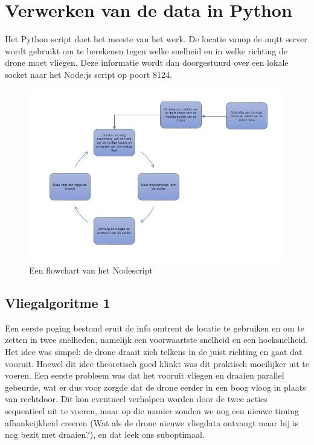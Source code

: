 \section{Verwerken van de data in Python}


Het Python script doet het meeste van het werk. De locatie vanop de mqtt server wordt gebruikt om te berekenen tegen welke snelheid en in welke richting de drone moet vliegen. Deze informatie wordt dan doorgestuurd over een lokale socket naar het Node.js script op poort 8124.

\begin{figure}[h]
\caption{Een flowchart van het Nodescript}
\centering
\includegraphics[width=\textwidth]{images/python_client_flowchart}
\end{figure}

\subsection{Vliegalgoritme 1}

Een eerste poging bestond eruit de info omtrent de locatie te gebruiken en om te zetten in twee snelheden, namelijk een voorwaartste snelheid en een hoeksnelheid. Het idee was simpel: de drone draait zich telkens in de juist richting en gaat dat vooruit. Hoewel dit idee theoretisch goed klinkt was dit praktisch moeilijker uit te voeren. Een eerste probleem was dat het vooruit vliegen en draaien parallel gebeurde, wat er dus voor zorgde dat de drone eerder in een boog vloog in plaats van rechtdoor. Dit kon eventueel verholpen worden door de twee acties sequentieel uit te voeren, maar op die manier zouden we nog een nieuwe timing afhankeijkheid creeren (Wat als de drone nieuwe vliegdata ontvangt maar hij is nog bezit met draaien?), en dat leek ons suboptimaal. 

